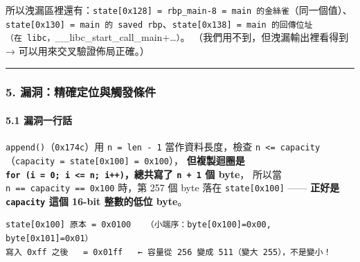 \documentclass[10pt,a4paper]{article}
\renewenvironment{quote}{%
  \begin{mdframed}[linewidth=0pt,innerleftmargin=0pt,innerrightmargin=0pt,
    innerbottommargin=0pt,innertopmargin=0pt,skipabove=0.55em,skipbelow=0.55em,
    leftmargin=0.9em,rightmargin=0.4em,startcode={\color{quotebar}\vrule width 2.6pt},%
    endcode={}]%
  \itshape\color{black}%
}{%
  \end{mdframed}%
}
\begin{document}
所以洩漏區裡還有：\texttt{state{[}0x128{]}\ \allowbreak{}=\ \allowbreak{}rbp\_\allowbreak{}main-\allowbreak{}8\ \allowbreak{}=\ \allowbreak{}main\ \allowbreak{}的金絲雀}（同一個值）、
\texttt{state{[}0x130{]}\ \allowbreak{}=\ \allowbreak{}main\ \allowbreak{}的\ \allowbreak{}saved\ \allowbreak{}rbp}、\texttt{state{[}0x138{]}\ \allowbreak{}=\ \allowbreak{}main\ \allowbreak{}的回傳位址（在\ \allowbreak{}libc，}\_\_libc\_start\_call\_main+\ldots{}\texttt{）}。
（我們用不到，但洩漏輸出裡看得到 → 可以用來交叉驗證佈局正確。）

\begin{center}\rule{0.5\linewidth}{0.5pt}\end{center}

\subsubsection{5.
漏洞：精確定位與觸發條件}\label{ux6f0fux6d1eux7cbeux78baux5b9aux4f4dux8207ux89f8ux767cux689dux4ef6}

\paragraph{5.1 漏洞一行話}\label{ux6f0fux6d1eux4e00ux884cux8a71}

\begin{quote}
\texttt{append()}（\texttt{0x174c}）用 \texttt{n\ \allowbreak{}=\ \allowbreak{}len\ \allowbreak{}-\allowbreak{}\ \allowbreak{}1}
當作資料長度，檢查
\texttt{n\ \allowbreak{}\textless{}\allowbreak{}=\ \allowbreak{}capacity}（\texttt{capacity\ \allowbreak{}=\ \allowbreak{}state{[}0x100{]}\ \allowbreak{}=\ \allowbreak{}0x100}），
\textbf{但複製迴圈是
\texttt{for\ \allowbreak{}(i\ \allowbreak{}=\ \allowbreak{}0;\ \allowbreak{}i\ \allowbreak{}\textless{}\allowbreak{}=\ \allowbreak{}n;\ \allowbreak{}i++)}，總共寫了
\texttt{n\ \allowbreak{}+\ \allowbreak{}1} 個 byte}， 所以當 \texttt{n\ \allowbreak{}==\ \allowbreak{}capacity\ \allowbreak{}==\ \allowbreak{}0x100}
時，第 257 個 byte 落在 \texttt{state{[}0x100{]}} ------ \textbf{正好是
\texttt{capacity} 這個 16-bit 整數的低位 byte}。
\end{quote}

\begin{Verbatim}[breaklines=true,breakanywhere=true,breakautoindent=false,fontsize=\fontsize{7.0}{9.5}\selectfont]
state[0x100] 原本 = 0x0100   （小端序：byte[0x100]=0x00, byte[0x101]=0x01）
寫入 0xff 之後   = 0x01ff   ← 容量從 256 變成 511（變大 255），不是變小！
\end{Verbatim}
\end{document}
